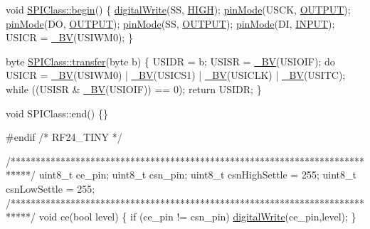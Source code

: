 \begin{DoxyCodeInclude}
\textcolor{keywordtype}{void} \hyperlink{group__Porting__SPI_gaf79095574842d60a6297aa5b01b6185f}{SPIClass::begin}() \{
  \hyperlink{group__Porting__General_gabda89b115581947337690b2f85bfab6e}{digitalWrite}(SS, \hyperlink{group__Porting__General_ga5bb885982ff66a2e0a0a45a8ee9c35e2}{HIGH});
  \hyperlink{group__Porting__General_ga361649efb4f1e2fa3c870ca203497d5e}{pinMode}(USCK, \hyperlink{group__Porting__General_ga61a3c9a18380aafb6e430e79bf596557}{OUTPUT});
  \hyperlink{group__Porting__General_ga361649efb4f1e2fa3c870ca203497d5e}{pinMode}(DO, \hyperlink{group__Porting__General_ga61a3c9a18380aafb6e430e79bf596557}{OUTPUT});
  \hyperlink{group__Porting__General_ga361649efb4f1e2fa3c870ca203497d5e}{pinMode}(SS, \hyperlink{group__Porting__General_ga61a3c9a18380aafb6e430e79bf596557}{OUTPUT});
  \hyperlink{group__Porting__General_ga361649efb4f1e2fa3c870ca203497d5e}{pinMode}(DI, \hyperlink{group__Porting__General_ga1bb283bd7893b9855e2f23013891fc82}{INPUT});
  USICR = \hyperlink{group__Porting__General_ga483c9de27db573099572f5485ef841c9}{\_BV}(USIWM0);
\}

byte \hyperlink{group__Porting__SPI_gad8a210abb2138c105350cc91972edfa9}{SPIClass::transfer}(byte b) \{
  USIDR = b;
  USISR = \hyperlink{group__Porting__General_ga483c9de27db573099572f5485ef841c9}{\_BV}(USIOIF);
  \textcolor{keywordflow}{do}
    USICR = \hyperlink{group__Porting__General_ga483c9de27db573099572f5485ef841c9}{\_BV}(USIWM0) | \hyperlink{group__Porting__General_ga483c9de27db573099572f5485ef841c9}{\_BV}(USICS1) | \hyperlink{group__Porting__General_ga483c9de27db573099572f5485ef841c9}{\_BV}(USICLK) | \hyperlink{group__Porting__General_ga483c9de27db573099572f5485ef841c9}{\_BV}(USITC);
  \textcolor{keywordflow}{while} ((USISR & \hyperlink{group__Porting__General_ga483c9de27db573099572f5485ef841c9}{\_BV}(USIOIF)) == 0);
  \textcolor{keywordflow}{return} USIDR;
\}

\textcolor{keywordtype}{void} SPIClass::end() \{\}

\textcolor{preprocessor}{#endif }\textcolor{comment}{/* RF24\_TINY */}\textcolor{preprocessor}{}

\textcolor{comment}{/****************************************************************************/}
uint8\_t ce\_pin; 
uint8\_t csn\_pin; 
uint8\_t csnHighSettle = 255;
uint8\_t csnLowSettle = 255;
\textcolor{comment}{/****************************************************************************/}
\textcolor{keywordtype}{void} ce(\textcolor{keywordtype}{bool} level) \{
  \textcolor{keywordflow}{if} (ce\_pin != csn\_pin) \hyperlink{group__Porting__General_gabda89b115581947337690b2f85bfab6e}{digitalWrite}(ce\_pin,level);
\}


\end{DoxyCodeInclude}
